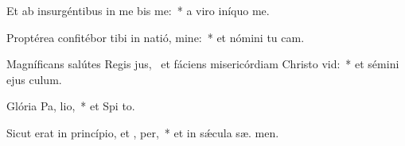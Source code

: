 \item Et ab insurgéntibus in me bis me:~* a viro iníquo  me.
\item Proptérea confitébor tibi in natió, mine:~* et nómini tu  cam.
\item Magníficans salútes Regis jus,~\pscross{} et fáciens misericórdiam Christo  vid:~* et sémini ejus   culum.
\item Glória Pa,  lio,~* et Spi to.
\item Sicut erat in princípio, et ,  per,~* et in sǽcula sæ. men.
